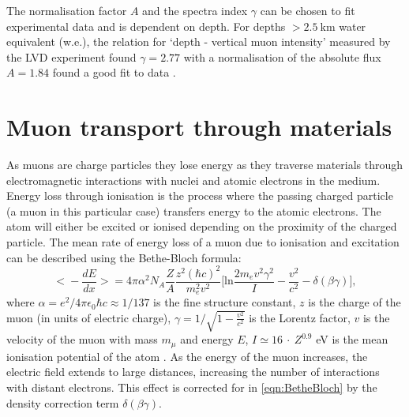 The normalisation factor $A$ and the spectra index $\gamma$ can be chosen to fit experimental data and is dependent on depth. For depths $>2.5~\text{km}$ water equivalent (w.e.), the relation for `depth - vertical muon intensity' measured by the LVD experiment found $\gamma=2.77$ with a normalisation of the absolute flux $A=1.84$ found a good fit to data \cite{LVD:1998lir}.

\section{Muon transport through materials}
As muons are charge particles they lose energy as they traverse materials through electromagnetic interactions with nuclei and atomic electrons in the medium. Energy loss through ionisation is the process where the passing charged particle (a muon in this particular case) transfers energy to the atomic electrons. The atom will either be excited or ionised depending on the proximity of the charged particle. The mean rate of energy loss of a muon due to ionisation and excitation can be described using the Bethe-Bloch formula:
\begin{equation}\label{eqn:BetheBloch}
    \Biggl<-\frac{dE}{dx}\Biggl>=4\pi\alpha^2N_A\frac{Z}{A}\frac{z^2(\hbar c)^2}{m_e^2v^2}\Biggl[\text{ln}\frac{2m_ev^2\gamma^2}{I}-\frac{v^2}{c^2}-\delta(\beta\gamma)\Biggl],
\end{equation}
where $\alpha=e^2/4\pi\epsilon_0\hbar c\approx1/137$ is the fine structure constant, $z$ is the charge of the muon (in units of electric charge), $\gamma=1/\sqrt{1-\frac{v^2}{c^2}}$ is the Lorentz factor, $v$ is the velocity of the muon with mass $m_\mu$ and energy $E$, $I\simeq16\:\cdot\:Z^{0.9}$ eV is the mean ionisation potential of the atom \cite{GROOM2001183}. As the energy of the muon increases, the electric field extends to large distances, increasing the number of interactions with distant electrons. This effect is corrected for in \autoref{eqn:BetheBloch} by the density correction term $\delta(\beta\gamma)$.

